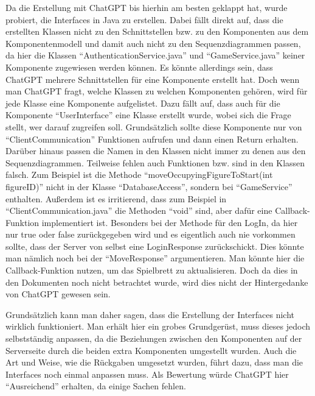 Da die Erstellung mit ChatGPT bis hierhin am besten geklappt hat, wurde probiert, die Interfaces in Java zu erstellen. Dabei fällt 
direkt auf, dass die erstellten Klassen nicht zu den Schnittstellen bzw. zu den Komponenten aus dem Komponentenmodell und damit auch 
nicht zu den Sequenzdiagrammen passen, da hier die Klassen ``AuthenticationService.java'' und ``GameService.java'' keiner Komponente 
zugewiesen werden können. Es könnte allerdings sein, dass ChatGPT mehrere Schnittstellen für eine Komponente erstellt hat. Doch wenn 
man ChatGPT fragt, welche Klassen zu welchen Komponenten gehören, wird für jede Klasse eine Komponente aufgelistet. Dazu fällt auf, dass 
auch für die Komponente ``UserInterface'' eine Klasse erstellt wurde, wobei sich die Frage stellt, wer darauf zugreifen soll. 
Grundsätzlich sollte diese Komponente nur von ``ClientCommunication'' Funktionen aufrufen und dann einen Return erhalten. Darüber hinaus 
passen die Namen in den Klassen nicht immer zu denen aus den Sequenzdiagrammen. Teilweise fehlen auch Funktionen bzw. sind in den 
Klassen falsch. Zum Beispiel ist die Methode ``moveOccupyingFigureToStart(int figureID)'' nicht in der Klasse ``DatabaseAccess'', sondern 
bei ``GameService'' enthalten. Außerdem ist es irritierend, dass zum Beispiel in ``ClientCommunication.java'' die Methoden ``void'' sind, 
aber dafür eine Callback-Funktion implementiert ist. Besonders bei der Methode für den LogIn, da hier nur true oder false 
zurückgegeben wird und es eigentlich auch nie vorkommen sollte, dass der Server von selbst eine LoginResponse zurückschickt. Dies 
könnte man nämlich noch bei der ``MoveResponse'' argumentieren. Man könnte hier die Callback-Funktion nutzen, um das Spielbrett 
zu aktualisieren. Doch da dies in den Dokumenten noch nicht betrachtet wurde, wird dies nicht der Hintergedanke von 
ChatGPT gewesen sein.

Grundsätzlich kann man daher sagen, dass die Erstellung der Interfaces nicht wirklich funktioniert. Man erhält hier ein grobes 
Grundgerüst, muss dieses jedoch selbstständig anpassen, da die Beziehungen zwischen den Komponenten auf der Serverseite durch die 
beiden extra Komponenten umgestellt wurden. Auch die Art und Weise, wie die Rückgaben umgesetzt wurden, führt dazu, dass man die 
Interfaces noch einmal anpassen muss. Als Bewertung würde ChatGPT hier ``Ausreichend'' erhalten, da einige Sachen fehlen.
